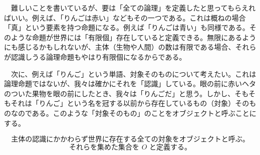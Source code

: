 \documentclass{article}
\begin{document}
　難しいことを書いているが、要は「全ての論理」を定義したと思ってもらえればいい。例えば、「りんごは赤い」などもその一つである。これは概ねの場合「真」という要素を持つ命題になる。例えば「りんごは青い」も同様である。そのような命題が世界には「有限個」存在していると定義できる。無限にあるようにも感じるかもしれないが、主体（生物や人間）の数は有限である場合、それらが認識しうる論理命題もやはり有限個になるからである。

　次に、例えば「りんご」という単語、対象そのものについて考えたい。これは論理命題ではないが、我々は確かにそれを「認識」している。眼の前に赤いヘタのついた果物を眼の前にしたとき、我々は「りんごだ」と思う。しかし、そもそもそれは「りんご」という名を冠する以前から存在しているもの（対象）そのものなのである。このような「対象そのもの」のことをオブジェクトと呼ぶことにする。

\[\text{主体の認識にかかわらず世界に存在する全ての対象をオブジェクトと呼ぶ。}\]
\[\text{それらを集めた集合を } O \text{ と定義する。}\]
\end{document}
